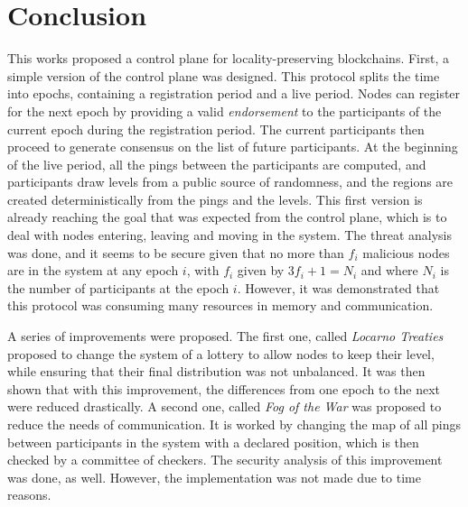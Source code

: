 \documentclass[a4paper,11pt,twoside=semi,openright]{report}
\begin{document}
\chapter{Conclusion} \label{chap:Conclusion} %


This works proposed a control plane for locality-preserving blockchains. First,
a simple version of the control plane was designed. This protocol splits the
time into epochs, containing a registration period and a live period. Nodes can
register for the next epoch by providing a valid \textit{endorsement} to the
participants of the current epoch during the registration period. The current
participants then proceed to generate consensus on the list of future
participants. At the beginning of the live period, all the pings between the
participants are computed, and participants draw levels from a public source of
randomness, and the regions are created deterministically from the pings and
the levels. This first version is already reaching the goal that was expected
from the control plane, which is to deal with nodes entering, leaving and
moving in the system. The threat analysis was done, and it seems to be secure
given that no more than $f_i$ malicious nodes are in the system at any epoch
$i$, with $f_i$ given by $3f_i+1=N_i$ and where $N_i$ is the number of
participants at the epoch $i$. However, it was demonstrated that this protocol
was consuming many resources in memory and communication. 

A series of improvements were proposed. The first one, called \textit{Locarno
Treaties} proposed to change the system of a lottery to allow nodes to keep
their level, while ensuring that their final distribution was not unbalanced.
It was then shown that with this improvement, the differences from one epoch to
the next were reduced drastically. A second one, called \textit{Fog of the War}
was proposed to reduce the needs of communication. It is worked by changing the
map of all pings between participants in the system with a declared position,
which is then checked by a committee of checkers. The security analysis of this
improvement was done, as well. However,  the implementation was not made due to time
reasons. 
\end{document}
